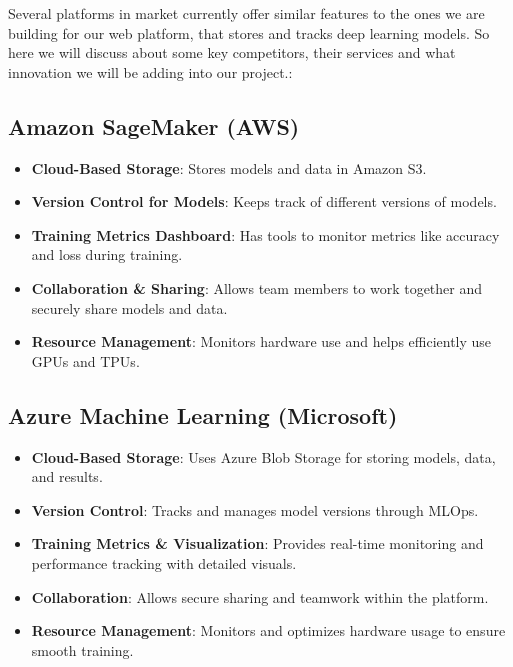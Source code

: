 \documentclass[12pt]{article}
\begin{document}
\maketitle

Several platforms in market currently offer similar features to the ones we are building for our web platform, that stores and tracks deep learning models. So here we will discuss about some key competitors, their services and what innovation we will be adding into our project.:

\subsection{Amazon SageMaker (AWS)}
\begin{itemize}
    \item \textbf{Cloud-Based Storage}: Stores models and data in Amazon S3.
    \item \textbf{Version Control for Models}: Keeps track of different versions of models.
    \item \textbf{Training Metrics Dashboard}: Has tools to monitor metrics like accuracy and loss during training.
    \item \textbf{Collaboration \& Sharing}: Allows team members to work together and securely share models and data.
    \item \textbf{Resource Management}: Monitors hardware use and helps efficiently use GPUs and TPUs.
\cite{aws_sagemaker}
    
\end{itemize}

\subsection*{Azure Machine Learning (Microsoft)}
\begin{itemize}
    \item \textbf{Cloud-Based Storage}: Uses Azure Blob Storage for storing models, data, and results.
    \item \textbf{Version Control}: Tracks and manages model versions through MLOps.
    \item \textbf{Training Metrics \& Visualization}: Provides real-time monitoring and performance tracking with detailed visuals.
    \item \textbf{Collaboration}: Allows secure sharing and teamwork within the platform.
    \item \textbf{Resource Management}: Monitors and optimizes hardware usage to ensure smooth training.
\cite{azume_ml}
    
\end{itemize}
\end{document}
